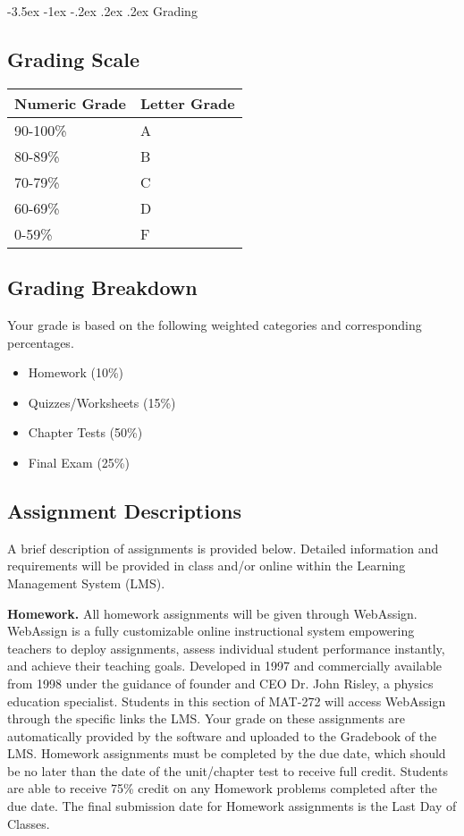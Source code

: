 \documentclass{article}
\makeatletter
\renewcommand\section{\@startsection{section}{1}{0pt}%
  {-3.5ex \@plus -1ex \@minus -.2ex}%
  {.2ex \@plus.2ex}%
  {\normalfont\Large\bfseries}} %
\makeatother
\begin{document}
\section{Grading}

\subsection{Grading Scale}

\bigskip\noindent
\begin{tabular}{p{}p{}}
\toprule
Numeric Grade & Letter Grade \\
\hline
90-100\% & A \\
80-89\% & B \\
70-79\% & C \\
60-69\% & D \\
0-59\% & F \\
\bottomrule
\end{tabular}

\bigskip\subsection{Grading Breakdown}

Your grade is based on the following weighted categories and corresponding percentages.

\begin{itemize}
\item Homework (10\%)
\item Quizzes/Worksheets (15\%)
\item Chapter Tests (50\%)
\item Final Exam (25\%)
\end{itemize}

\subsection{Assignment Descriptions}

A brief description of assignments is provided below. Detailed information and requirements will be provided in class and/or online within the Learning Management System (LMS).

\textbf{Homework.} All homework assignments will be given through WebAssign. WebAssign is a fully customizable online instructional system empowering teachers to deploy assignments, assess individual student performance instantly, and achieve their teaching goals. Developed in 1997 and commercially available from 1998 under the guidance of founder and CEO Dr. John Risley, a physics education specialist. Students in this section of MAT-272 will access WebAssign through the specific links the LMS. Your grade on these assignments are automatically provided by the software and uploaded to the Gradebook of the LMS. Homework assignments must be completed by the due date, which should be no later than the date of the unit/chapter test to receive full credit. Students are able to receive 75\% credit on any Homework problems completed after the due date. The final submission date for Homework assignments is the Last Day of Classes.
\end{document}
